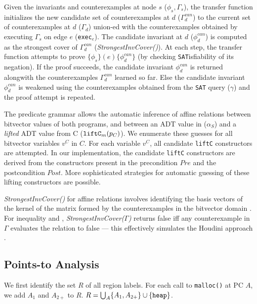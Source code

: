 Given the invariants and counterexamples at node $s$
($\phi_s,\Gamma_s$),
the transfer function initializes the new candidate set
of counterexamples at $d$ ($\Gamma^{can}_{d}$)
to the current set of counterexamples at $d$ ($\Gamma_{d}$) union-ed with
the counterexamples obtained by executing $\Gamma_s$ on edge $e$ ({\tt exec$_e$}).
The candidate invariant at $d$ ($\phi^{can}_d$) is computed
as the strongest cover of $\Gamma^{can}_{d}$ ({\em StrongestInvCover()}).
At each step, the transfer function attempts to prove
$\{\phi_s\} (e) \{\phi^{can}_d\}$ (by checking {\tt SAT}isfiability of its
negation). If the proof succeeds, the candidate invariant $\phi^{can}_d$ is
returned alongwith the counterexamples $\Gamma^{can}_d$ learned so far.
Else the candidate invariant $\phi^{can}_d$ is weakened using
the counterexamples obtained from the {\tt SAT} query ($\gamma$) and the proof attempt is
repeated.

The predicate grammar allows the automatic inference of
affine relations between bitvector values of both
programs, and \recursiveRelations{} between an ADT value in \SpecL{} ($\alpha_S$)
and a {\em lifted} ADT value from C (${\tt liftC}_m(p_C)$).
We enumerate these \recursiveRelation{}
guesses for all bitvector variables $v^{C}$ in $C$. For each variable $v^{C}$,
all candidate {\tt liftC} constructors are attempted. In
our implementation, the candidate
{\tt liftC}
constructors are derived from the constructors
present in the precondition $Pre$
and the postcondition $Post$.  More
sophisticated strategies for automatic guessing of
these lifting constructors
are possible.

{\em StrongestInvCover()} for affine relations involves
identifying the basis vectors of the kernel of the
matrix formed by the counterexamples in the bitvector
domain \cite{esop05,semalign}.
For inequality and
\recursiveRelations{}, {\em StrongestInvCover($\Gamma$)}
returns false iff any counterexample in $\Gamma$ evaluates the
relation to false --- this effectively simulates the Houdini approach \cite{houdini}.


\subsection{Points-to Analysis}
\label{sec:pointsToFormal}
We first identify the set $R$ of all region labels.
For each call to {\tt malloc()} at PC $A$,
we add $A_1$ and $A_{2+}$ to $R$. $R=\bigcup_{A}\{A_1,A_{2+}\}\cup\{{\tt heap}\}$.

